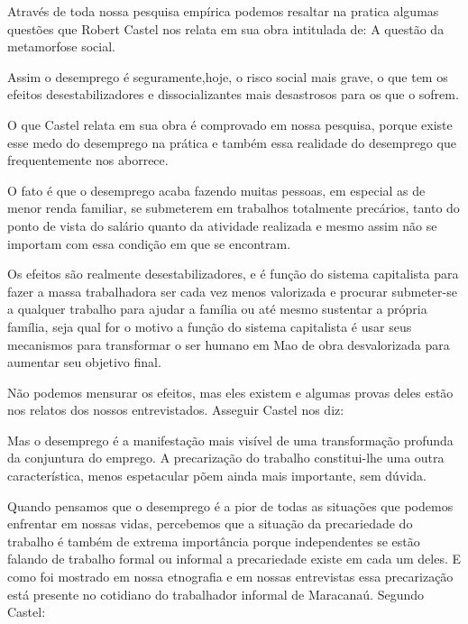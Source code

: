 Através de toda nossa pesquisa empírica podemos resaltar na pratica algumas 
questões que Robert Castel nos relata em sua obra intitulada de: A questão da 
metamorfose social.

\begin{citacao}
Assim o desemprego é seguramente,hoje, o risco social mais grave, o que tem os 
efeitos desestabilizadores e dissocializantes mais desastrosos para os que o 
sofrem. \cite{castel1998metamorfoses}
\end{citacao}

O que Castel relata em sua obra é comprovado em nossa pesquisa, porque existe 
esse medo do desemprego na prática e também essa realidade do desemprego que 
frequentemente nos aborrece. 

O fato é que o desemprego acaba fazendo muitas 
pessoas, em especial as de menor renda familiar, se submeterem em trabalhos 
totalmente precários, tanto do ponto de vista do salário quanto da atividade 
realizada e mesmo assim não se importam com essa condição em que se encontram.

Os efeitos são realmente desestabilizadores, e é função do sistema capitalista 
para fazer a massa trabalhadora ser cada vez menos valorizada e procurar 
submeter-se a qualquer trabalho para ajudar a família ou até mesmo sustentar a 
própria família, seja qual for o motivo a função do sistema capitalista é usar 
seus mecanismos para transformar o ser humano em Mao de obra desvalorizada para 
aumentar seu objetivo final. 

Não podemos mensurar os efeitos, mas eles existem e 
algumas provas deles estão nos relatos dos nossos entrevistados. Asseguir Castel 
nos diz:

\begin{citacao}
Mas o desemprego é a manifestação mais visível de uma transformação profunda da 
conjuntura do emprego. A precarização do trabalho constitui-lhe uma outra 
característica, menos espetacular põem ainda mais importante, sem dúvida. \cite{castel1998metamorfoses}
\end{citacao}

Quando pensamos que o desemprego é a pior de todas as situações que podemos 
enfrentar em nossas vidas, percebemos que a situação da precariedade do trabalho 
é também de extrema importância porque independentes se estão falando de 
trabalho formal ou informal a precariedade existe em cada um deles. E como foi 
mostrado em nossa etnografia e em nossas entrevistas essa precarização está 
presente no cotidiano do trabalhador informal de Maracanaú. Segundo Castel:

